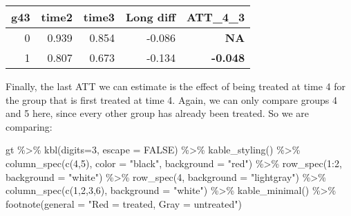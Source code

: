 \documentclass[
]{article}
\newenvironment{Shaded}{\begin{snugshade}}{\end{snugshade}}
\newcommand{\AttributeTok}[1]{\textcolor[rgb]{0.77,0.63,0.00}{#1}}
\newcommand{\ConstantTok}[1]{\textcolor[rgb]{0.00,0.00,0.00}{#1}}
\newcommand{\DecValTok}[1]{\textcolor[rgb]{0.00,0.00,0.81}{#1}}
\newcommand{\FunctionTok}[1]{\textcolor[rgb]{0.00,0.00,0.00}{#1}}
\newcommand{\NormalTok}[1]{#1}
\newcommand{\SpecialCharTok}[1]{\textcolor[rgb]{0.00,0.00,0.00}{#1}}
\newcommand{\StringTok}[1]{\textcolor[rgb]{0.31,0.60,0.02}{#1}}
\begin{document}
\begin{table}
\centering
\begin{tabular}{r|r|r|r|>{}r}
\hline
g43 & time2 & time3 & Long diff & ATT\_4\_3\\
\hline
0 & 0.939 & 0.854 & -0.086 & \textbf{NA}\\
\hline
1 & 0.807 & 0.673 & -0.134 & \textbf{-0.048}\\
\hline
\end{tabular}
\end{table}

Finally, the last ATT we can estimate is the effect of being treated at
time 4 for the group that is first treated at time 4. Again, we can only
compare groups 4 and 5 here, since every other group has already been
treated. So we are comparing:

\begin{Shaded}
\begin{Highlighting}[]
\NormalTok{gt }\SpecialCharTok{\%\textgreater{}\%}
  \FunctionTok{kbl}\NormalTok{(}\AttributeTok{digits=}\DecValTok{3}\NormalTok{, }\AttributeTok{escape =} \ConstantTok{FALSE}\NormalTok{) }\SpecialCharTok{\%\textgreater{}\%}
  \FunctionTok{kable\_styling}\NormalTok{() }\SpecialCharTok{\%\textgreater{}\%}
  \FunctionTok{column\_spec}\NormalTok{(}\FunctionTok{c}\NormalTok{(}\DecValTok{4}\NormalTok{,}\DecValTok{5}\NormalTok{), }\AttributeTok{color =} \StringTok{"black"}\NormalTok{, }\AttributeTok{background =} \StringTok{"red"}\NormalTok{) }\SpecialCharTok{\%\textgreater{}\%}
  \FunctionTok{row\_spec}\NormalTok{(}\DecValTok{1}\SpecialCharTok{:}\DecValTok{2}\NormalTok{, }\AttributeTok{background =} \StringTok{"white"}\NormalTok{) }\SpecialCharTok{\%\textgreater{}\%}
  \FunctionTok{row\_spec}\NormalTok{(}\DecValTok{4}\NormalTok{, }\AttributeTok{background =} \StringTok{"lightgray"}\NormalTok{) }\SpecialCharTok{\%\textgreater{}\%}
  \FunctionTok{column\_spec}\NormalTok{(}\FunctionTok{c}\NormalTok{(}\DecValTok{1}\NormalTok{,}\DecValTok{2}\NormalTok{,}\DecValTok{3}\NormalTok{,}\DecValTok{6}\NormalTok{), }\AttributeTok{background =} \StringTok{"white"}\NormalTok{) }\SpecialCharTok{\%\textgreater{}\%}
  \FunctionTok{kable\_minimal}\NormalTok{() }\SpecialCharTok{\%\textgreater{}\%}
  \FunctionTok{footnote}\NormalTok{(}\AttributeTok{general =} \StringTok{"Red = treated, Gray = untreated"}\NormalTok{)}
\end{Highlighting}
\end{Shaded}
\end{document}
